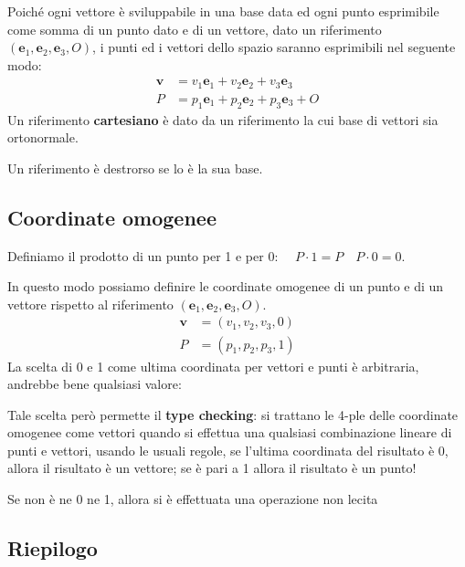 \documentclass[a4paper, 10pt]{article}
\renewcommand{\vec}{\bm}
\begin{document}
			\noindent
			Poiché ogni vettore è sviluppabile in una base data ed ogni
			punto esprimibile come somma di un punto dato e di un
			vettore, dato un riferimento $ (\vec{e}_1, \vec{e}_2, \vec{e}_3, O) $, i punti ed i vettori
			dello spazio saranno esprimibili nel seguente modo:
			\begin{align*}
				\vec{v} &= v_1\vec{e}_1 + v_2\vec{e}_2 + v_3\vec{e}_3 \\
				P &= p_1\vec{e}_1 + p_2\vec{e}_2 + p_3\vec{e}_3 + O
			\end{align*}
			Un riferimento \textbf{cartesiano} è dato da un riferimento la cui base
			di vettori sia ortonormale. 
			
			\noindent
			Un riferimento è destrorso se lo è la sua base.
			
		\subsection{Coordinate omogenee}
			Definiamo il prodotto di un punto per 1 e per 0: $ \quad P\cdot 1 = P \quad P\cdot 0 = 0 $.
			
			In questo modo possiamo definire le coordinate omogenee di
			un punto e di un vettore rispetto al riferimento $ (\vec{e}_1 , \vec{e}_2 , \vec{e}_3 ,O) $.
			\begin{align*}
				\vec{v} &= (v_1, v_2, v_3, 0) \\
				P &= (p_1, p_2, p_3, 1)
			\end{align*}
			La scelta di 0 e 1 come ultima coordinata per vettori e punti è
			arbitraria, andrebbe bene qualsiasi valore:
			
			\noindent
			Tale scelta però permette il \textbf{type checking}: si trattano le 4-ple delle
			coordinate omogenee come vettori quando si effettua una qualsiasi
			combinazione lineare di punti e vettori, usando le usuali regole, se
			l'ultima coordinata del risultato è 0, allora il risultato è un vettore;
			se è pari a 1 allora il risultato è un punto!
			
			\noindent
			Se non è ne 0 ne 1, allora si è effettuata una operazione non lecita
		
		\subsection{Riepilogo}
		
\end{document}
